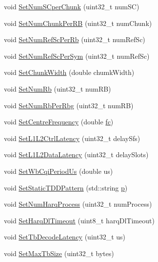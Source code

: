 \begin{DoxyCompactItemize}
void \hyperlink{classns3_1_1MmWavePhyMacCommon_a2f655f21939a2e111cbca160a564a3c1}{Set\+Num\+S\+Cper\+Chunk} (uint32\+\_\+t num\+SC)
\item 
void \hyperlink{classns3_1_1MmWavePhyMacCommon_ac9134d402fc1d15d55d9aba4fed847ea}{Set\+Num\+Chunk\+Per\+RB} (uint32\+\_\+t num\+Chunk)
\item 
void \hyperlink{classns3_1_1MmWavePhyMacCommon_a79c6c80ace5df6078d1ae0bf8de7bbb0}{Set\+Num\+Ref\+Sc\+Per\+Rb} (uint32\+\_\+t num\+Ref\+Sc)
\item 
void \hyperlink{classns3_1_1MmWavePhyMacCommon_ae57b7bad8fea7130ff476acfda61b3ba}{Set\+Num\+Ref\+Sc\+Per\+Sym} (uint32\+\_\+t num\+Ref\+Sc)
\item 
void \hyperlink{classns3_1_1MmWavePhyMacCommon_a938f779b45d3ab2eb2bebf5851150506}{Set\+Chunk\+Width} (double chumk\+Width)
\item 
void \hyperlink{classns3_1_1MmWavePhyMacCommon_ad6fb75a21f36a97d54bc76e08f9d2eab}{Set\+Num\+Rb} (uint32\+\_\+t num\+RB)
\item 
void \hyperlink{classns3_1_1MmWavePhyMacCommon_a701574310fea9ec326158f4ddf7bfcd7}{Set\+Num\+Rb\+Per\+Rbg} (uint32\+\_\+t num\+RB)
\item 
void \hyperlink{classns3_1_1MmWavePhyMacCommon_aedd5144c7662486fe30c318ab856913f}{Set\+Centre\+Frequency} (double \hyperlink{lte__uplink__power__control_8m_a72d54db2b27ce046aab6e6a414c407e9}{fc})
\item 
void \hyperlink{classns3_1_1MmWavePhyMacCommon_a5385eb1976e50e670c913b882ba188b0}{Set\+L1\+L2\+Ctrl\+Latency} (uint32\+\_\+t delay\+Sfs)
\item 
void \hyperlink{classns3_1_1MmWavePhyMacCommon_a9f7f96a5aa3168ba7606bb1a3a882a7c}{Set\+L1\+L2\+Data\+Latency} (uint32\+\_\+t delay\+Slots)
\item 
void \hyperlink{classns3_1_1MmWavePhyMacCommon_a0ce57099c94a321a7f66135a513e9cff}{Set\+Wb\+Cqi\+Period\+Us} (double us)
\item 
void \hyperlink{classns3_1_1MmWavePhyMacCommon_a6eb7d7a839d06f77c716362c2a25b09b}{Set\+Static\+T\+D\+D\+Pattern} (std\+::string \hyperlink{lte__link__budget__x2__handover__measures_8m_ac9de518908a968428863f829398a4e62}{p})
\item 
void \hyperlink{classns3_1_1MmWavePhyMacCommon_ab50bd6de7d48c9404d240b7b23031999}{Set\+Num\+Harq\+Process} (uint32\+\_\+t num\+Process)
\item 
void \hyperlink{classns3_1_1MmWavePhyMacCommon_afa73c8e460dd5c7d57249e5da5436a5c}{Set\+Harq\+Dl\+Timeout} (uint8\+\_\+t harq\+Dl\+Timeout)
\item 
void \hyperlink{classns3_1_1MmWavePhyMacCommon_a955f8f6b707ad3a92333c06394292b46}{Set\+Tb\+Decode\+Latency} (uint32\+\_\+t us)
\item 
void \hyperlink{classns3_1_1MmWavePhyMacCommon_a891c78c58453567f2671c6caab3d7891}{Set\+Max\+Tb\+Size} (uint32\+\_\+t bytes)
\end{DoxyCompactItemize}
